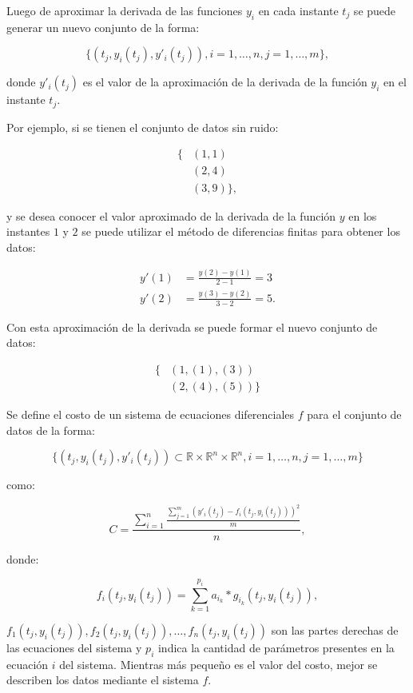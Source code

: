 Luego de aproximar la derivada de las funciones $y_i$ en cada instante $t_j$ se puede generar un nuevo conjunto de la forma:

$$\{(t_j, y_i(t_j), y'_{i}(t_j)), i = 1, \dots, n, j = 1, \dots, m\},$$

donde $y'_{i}(t_j)$ es el valor de la aproximación de la derivada de la función $y_i$ en el instante $t_j$.

Por ejemplo, si se tienen el conjunto de datos sin ruido:

\begin{align*}
    \{ & (1, 1)     \\
       & (2, 4)     \\
       & (3, 9) \},
\end{align*}

y se desea conocer el valor aproximado de la derivada de la función $y$ en los instantes $1$ y $2$ se puede utilizar el método de diferencias finitas para obtener los datos:

\begin{align*}
    y'(1) & = \frac{y(2) - y(1)}{2 - 1} = 3  \\
    y'(2) & = \frac{y(3) - y(2)}{3 - 2} = 5.
\end{align*}

Con esta aproximación de la derivada se puede formar el nuevo conjunto de datos:

\begin{align*}
    \{ & (1, (1), (3))    \\
       & (2, (4), (5)) \}
\end{align*}

Se define el costo de un sistema de ecuaciones diferenciales $f$ para el conjunto de datos de la forma:

$$\{(t_j, y_i(t_j), y'_i(t_j)) \subset \mathbb{R} \times \mathbb{R}^{n} \times \mathbb{R}^n, i = 1, \dots, n, j = 1, \dots, m\}$$

como:

$$C = \frac{\sum_{i=1}^n\frac{\sum_{j=1}^{m}(y'_i(t_j) - f_i(t_j, y_i(t_j)))^2}{m}}{n},$$

donde:

$$f_i(t_j, y_i(t_j)) = \sum_{k=1}^{p_i} a_{i_k} * g_{i_k}(t_j, y_i(t_j)),$$

$f_1(t_j, y_i(t_j)), f_2(t_j, y_i(t_j)), \dots, f_n(t_j, y_i(t_j))$ son las partes derechas de las ecuaciones del sistema y $p_i$ indica la cantidad de parámetros presentes en la ecuación $i$ del sistema. Mientras más pequeño es el valor del costo, mejor se describen los datos mediante el sistema $f$.

